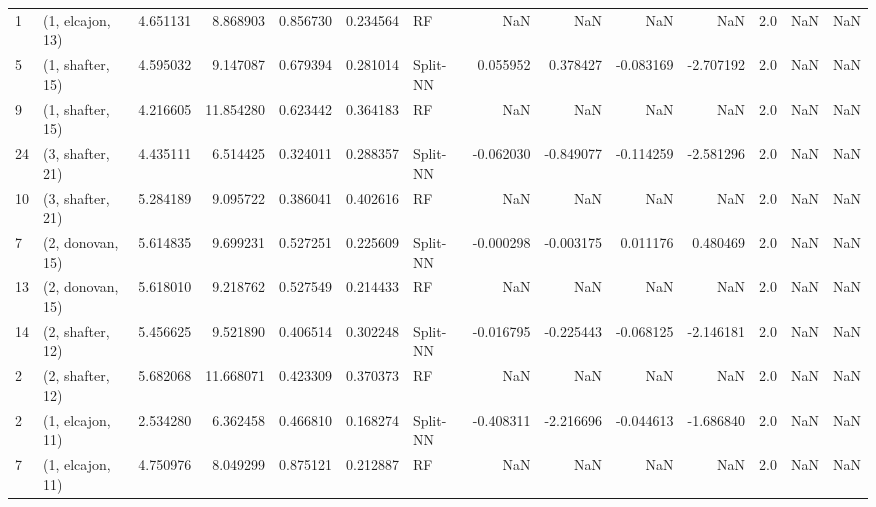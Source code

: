 \begin{tabular}{llrrrrlrrrrrrl}
1  &  (1, elcajon, 13) &   4.651131 &   8.868903 &   0.856730 &  0.234564 &          RF &             NaN &           NaN &            NaN &          NaN &            2.0 &    NaN &              NaN \\
5  &  (1, shafter, 15) &   4.595032 &   9.147087 &   0.679394 &  0.281014 &    Split-NN &        0.055952 &      0.378427 &      -0.083169 &    -2.707192 &            2.0 &    NaN &              NaN \\
9  &  (1, shafter, 15) &   4.216605 &  11.854280 &   0.623442 &  0.364183 &          RF &             NaN &           NaN &            NaN &          NaN &            2.0 &    NaN &              NaN \\
24 &  (3, shafter, 21) &   4.435111 &   6.514425 &   0.324011 &  0.288357 &    Split-NN &       -0.062030 &     -0.849077 &      -0.114259 &    -2.581296 &            2.0 &    NaN &              NaN \\
10 &  (3, shafter, 21) &   5.284189 &   9.095722 &   0.386041 &  0.402616 &          RF &             NaN &           NaN &            NaN &          NaN &            2.0 &    NaN &              NaN \\
7  &  (2, donovan, 15) &   5.614835 &   9.699231 &   0.527251 &  0.225609 &    Split-NN &       -0.000298 &     -0.003175 &       0.011176 &     0.480469 &            2.0 &    NaN &              NaN \\
13 &  (2, donovan, 15) &   5.618010 &   9.218762 &   0.527549 &  0.214433 &          RF &             NaN &           NaN &            NaN &          NaN &            2.0 &    NaN &              NaN \\
14 &  (2, shafter, 12) &   5.456625 &   9.521890 &   0.406514 &  0.302248 &    Split-NN &       -0.016795 &     -0.225443 &      -0.068125 &    -2.146181 &            2.0 &    NaN &              NaN \\
2  &  (2, shafter, 12) &   5.682068 &  11.668071 &   0.423309 &  0.370373 &          RF &             NaN &           NaN &            NaN &          NaN &            2.0 &    NaN &              NaN \\
2  &  (1, elcajon, 11) &   2.534280 &   6.362458 &   0.466810 &  0.168274 &    Split-NN &       -0.408311 &     -2.216696 &      -0.044613 &    -1.686840 &            2.0 &    NaN &              NaN \\
7  &  (1, elcajon, 11) &   4.750976 &   8.049299 &   0.875121 &  0.212887 &          RF &             NaN &           NaN &            NaN &          NaN &            2.0 &    NaN &              NaN \\

\end{tabular}
